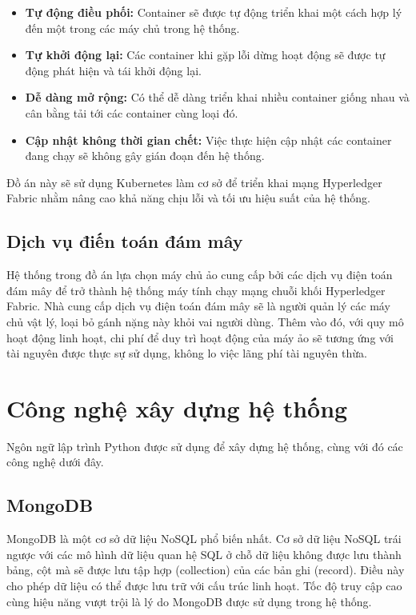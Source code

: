 \documentclass[../DoAn.tex]{subfiles}
\begin{document}
\begin{itemize}
  \item \textbf{Tự động điều phối:} Container sẽ được tự động triển khai một cách hợp lý đến một trong các máy chủ trong hệ thống.
  \item \textbf{Tự khởi động lại:} Các container khi gặp lỗi dừng hoạt động sẽ được tự động phát hiện và tái khởi động lại.
  \item \textbf{Dễ dàng mở rộng:} Có thể dễ dàng triển khai nhiều container giống nhau và cân bằng tải tới các container cùng loại đó.
  \item \textbf{Cập nhật không thời gian chết:} Việc thực hiện cập nhật các container đang chạy sẽ không gây gián đoạn đến hệ thống.
\end{itemize}

Đồ án này sẽ sử dụng Kubernetes làm cơ sở để triển khai mạng Hyperledger Fabric nhằm nâng cao khả năng chịu lỗi và tối ưu hiệu suất của hệ thống.

\subsection{Dịch vụ điến toán đám mây}
Hệ thống trong đồ án lựa chọn máy chủ ảo cung cấp bởi các dịch vụ điện toán đám
mây để trở thành hệ thống máy tính chạy mạng chuỗi khối Hyperledger Fabric. Nhà
cung cấp dịch vụ điện toán đám mây sẽ là người quản lý các máy chủ vật lý, loại
bỏ gánh nặng này khỏi vai người dùng. Thêm vào đó, với quy mô hoạt động linh
hoạt, chi phí để duy trì hoạt động của máy ảo sẽ tương ứng với tài nguyên được
thực sự sử dụng, không lo việc lãng phí tài nguyên thừa.

\section{Công nghệ xây dựng hệ thống}

Ngôn ngữ lập trình Python được sử dụng để xây dựng hệ thống, cùng với đó các
công nghệ dưới đây.

\subsection{MongoDB}

MongoDB\cite{mongodb} là một cơ sở dữ liệu NoSQL phổ biến nhất. Cơ sở dữ liệu NoSQL trái
ngược với các mô hình dữ liệu quan hệ SQL ở chỗ dữ liệu không được lưu thành
bảng, cột mà sẽ được lưu tập hợp (collection) của các bản ghi (record). Điều
này cho phép dữ liệu có thể được lưu trữ với cấu trúc linh hoạt. Tốc độ truy
cập cao cùng hiệu năng vượt trội là lý do MongoDB được sử dụng trong hệ thống.
\end{document}
